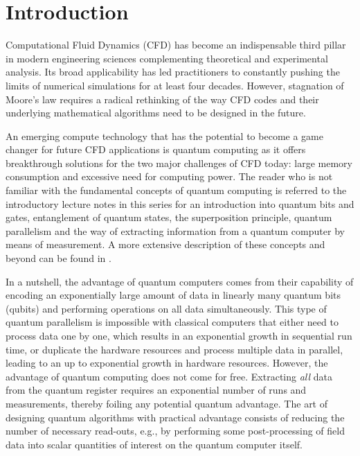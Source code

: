 \section{Introduction}

Computational Fluid Dynamics (CFD) has become an indispensable third pillar in modern engineering sciences complementing theoretical and experimental analysis. Its broad applicability has led practitioners to constantly pushing the limits of numerical simulations for at least four decades. However, stagnation of Moore's law requires a radical rethinking of the way CFD codes and their underlying mathematical algorithms need to be designed in the future.

An emerging compute technology that has the potential to become a game changer for future CFD applications is quantum computing as it offers breakthrough solutions for the two major challenges of CFD today: large memory consumption and excessive need for computing power. The reader who is not familiar with the fundamental concepts of quantum computing is referred to the introductory lecture notes in this series for an introduction into quantum bits and gates, entanglement of quantum states, the superposition principle, quantum parallelism and the way of extracting information from a quantum computer by means of measurement. A more extensive description of these concepts and beyond can be found in \cite{mikeandike,DeWolf}. 

\normalem
In a nutshell, the advantage of quantum computers comes from their capability of encoding an exponentially large amount of data in linearly many quantum bits (qubits) and performing operations on all data simultaneously. This type of quantum parallelism is impossible with classical computers that either need to process data one by one, which results in an exponential growth in sequential run time, or duplicate the hardware resources and process multiple data in parallel, leading to an up to exponential growth in hardware resources. However, the advantage of quantum computing does not come for free. Extracting \emph{all} data from the quantum register requires an exponential number of runs and measurements, thereby foiling any potential quantum advantage. The art of designing quantum algorithms with practical advantage consists of reducing the number of necessary read-outs, e.g., by performing some post-processing of field data into scalar quantities of interest on the quantum computer itself.

